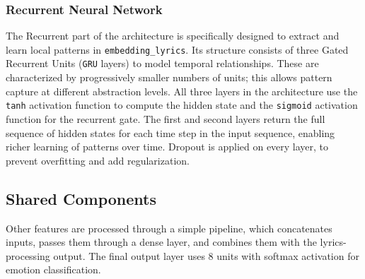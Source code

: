 \subsubsection*{Recurrent Neural Network}
The Recurrent part of the architecture is specifically designed to extract and learn
local patterns in \texttt{embedding\_lyrics}.
Its structure consists of three Gated Recurrent Units (\texttt{GRU} layers)
to model temporal relationships. These are characterized by progressively smaller
numbers of units; this allows pattern capture at different abstraction levels.
All three layers in the architecture use the \texttt{tanh} activation function
to compute the hidden state and
the \texttt{sigmoid} activation function for the recurrent gate.
The first and second layers return the full sequence of hidden states for each
time step in the input sequence, enabling richer learning of patterns over time.
Dropout is applied on every layer, to prevent overfitting and add regularization.

\subsection*{Shared Components}

Other features are processed through a simple pipeline, which concatenates inputs,
passes them through a dense layer, and combines them with the lyrics-processing
output. The final output layer uses 8 units with softmax activation for emotion
classification.\\


